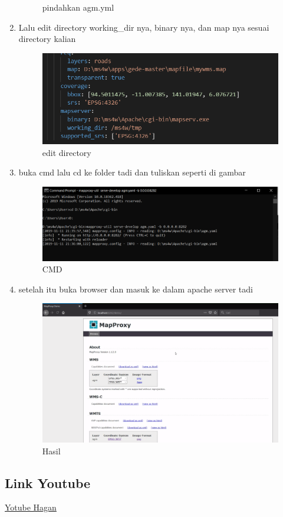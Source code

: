 \begin{enumerate}
\begin{figure}[H]
		\centering
		\caption{pindahkan agm.yml}
	\end{figure}
    \item Lalu edit directory working_dir nya, binary nya, dan map nya sesuai directory kalian
    \hfill\break
    \begin{figure}[H]
		\includegraphics[width=12cm]{figures/1174040/Python3/9.PNG}
		\centering
		\caption{edit directory}
	\end{figure}
    \item buka cmd lalu cd ke folder tadi dan tuliskan seperti di gambar
    \hfill\break
    \begin{figure}[H]
		\includegraphics[width=12cm]{figures/1174040/Python3/10.PNG}
		\centering
		\caption{CMD}
	\end{figure}
    \item setelah itu buka browser dan masuk ke dalam apache server tadi
    \hfill\break
    \begin{figure}[H]
		\includegraphics[width=12cm]{figures/1174040/Python3/browser.PNG}
		\centering
		\caption{Hasil}
	\end{figure}
\end{enumerate}    
\subsection{Link Youtube}
\href{https://www.youtube.com/watch?v=8aFRr9DbjQ8}{Yotube Hagan}